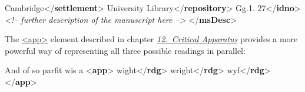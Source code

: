 \begin{shaded}
\mbox{}\newline 
\hspace*{1em}Cambridge{</\textbf{settlement}>}\mbox{}\newline 
\hspace*{1em}University Library{</\textbf{repository}>}\mbox{}\newline 
\hspace*{1em}Gg.1. 27{</\textbf{idno}>}\mbox{}\newline 
{}\mbox{}\newline 
\textit{<!-- further description of the manuscript here -->}\mbox{}\newline 
{</\textbf{msDesc}>}\end{shaded}\egroup\par \par
The \hyperref[TEI.app]{<app>} element described in chapter \textit{\hyperref[TC]{12.\ Critical Apparatus}} provides a more powerful way of representing all three possible readings in parallel: \par\bgroup{}\exampleFont \begin{shaded}\noindent\mbox{}And of so parfit wis a {<\textbf{app}>}\mbox{}\newline 
{}wight{</\textbf{rdg}>}\mbox{}\newline 
{}wright{</\textbf{rdg}>}\mbox{}\newline 
{}wyf{</\textbf{rdg}>}\mbox{}\newline 
{</\textbf{app}>}\end{shaded}\egroup\par \par
